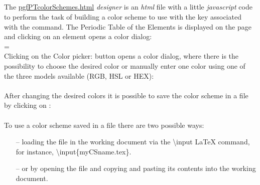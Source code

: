 \subsection*{}{\normalfont\large\bfseries\raisebox{1.25pt}{$\maltese$\ Designing a color scheme with \tmpSection}}%
\label{design:CSscheme}%
\vfill{}
\vfill The \href{run:pgfPTcolorSchemes.html}{pgfPTcolorSchemes.html} \textit{designer} is an \textit{html} file with a little \textit{javascript} code to perform the task of building a color scheme to use with the  key associated with the  command.
\newpage The Periodic Table of the Elements is displayed on the page and clicking on an element opens a color dialog:
\\ [4pt]
=\hbox{}%
\\ [8pt]Clicking on the {\small Color picker:\hspace{.2ex}} button opens a color dialog, where there is the possibility to choose the desired color or manually enter one color using one of the three models available (RGB, HSL or HEX):
\\ [4pt]
\\ [8pt]After changing the desired colors it is possible to save the color scheme in a file by clicking on :
\\ [4pt]
\\ [8pt]To use a color scheme saved in a file there are two possible ways:
\begin{itemize}
    \item[--]loading the file in the working document via the {\large\textsf{\textbackslash input}} \LaTeX{} command, for instance, {\large\textsf{\textbackslash input\{myCSname.tex\}}}.
    \item[--]or by opening the file and copying and pasting its contents into the working document.
\end{itemize}
